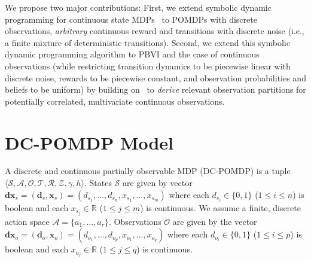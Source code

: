 \documentclass{article} %
\renewcommand{\vec}[1]{\mathbf{#1}} %
\newcommand{\xds}{\mathbf{dx}_s}
\newcommand{\xdo}{\mathbf{dx}_o}
\begin{document}
We propose two major contributions:  First, we extend
symbolic dynamic programming for continuous state
MDPs~\cite{sanner_uai11} to POMDPs with discrete 
observations, 
\emph{arbitrary} continuous reward and transitions with discrete noise
(i.e., a finite mixture of deterministic transitions).  Second, we
extend this symbolic dynamic programming algorithm to PBVI and the case of
continuous observations (while restricting 
transition dynamics to be piecewise linear with discrete noise, rewards to be
piecewise constant, and observation probabilities and 
beliefs to be uniform) by building 
on~\cite{pascal_ijcai05} to \emph{derive} relevant observation
partitions for potentially correlated, multivariate continuous
observations. %



\section{DC-POMDP Model} 

\label{sec:model}

A discrete and continuous
partially observable MDP (DC-POMDP) is a tuple $\langle
\mathcal{S},\mathcal{A},\mathcal{O},\mathcal{T},\mathcal{R},\mathcal{Z},\gamma,h
\rangle$.  States $\mathcal{S}$ are given by vector 
$\xds = (\vec{d}_s,\vec{x}_s) = (
d_{s_1},\ldots,d_{s_n},x_{s_1},\ldots,x_{s_m} )$ where each $d_{s_i}
\in \{ 0,1 \}$ ($1 \leq i \leq n$) is boolean and each
$x_{s_j} \in \mathbb{R}$ ($1 \leq j \leq m$) is continuous.
We assume a finite, discrete action space $\mathcal{A} = \{ a_1,
\ldots, a_r \}$. Observations
$\mathcal{O}$ are given by the vector $\xdo = (\vec{d}_o,\vec{x}_o) = (
d_{o_1},\ldots,d_{o_p},x_{o_1},\ldots,x_{o_q} )$ where each $d_{o_i}
\in \{ 0,1 \}$ ($1 \leq i \leq p$) is boolean and each $x_{o_j} \in
\mathbb{R}$ ($1 \leq j \leq q$) is continuous.
\end{document}
